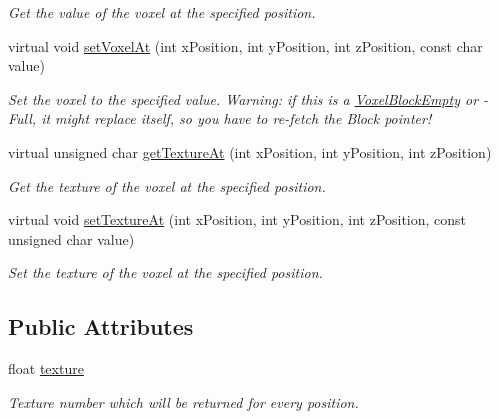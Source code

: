 \begin{DoxyCompactItemize}
\begin{DoxyCompactList}\small\item\em \-Get the value of the voxel at the specified position. \end{DoxyCompactList}\item 
\hypertarget{classVoxelBlockEmpty_a84752cd1c0779368ebcaa0dd67b84b40}{
virtual void \hyperlink{classVoxelBlockEmpty_a84752cd1c0779368ebcaa0dd67b84b40}{set\-Voxel\-At} (int x\-Position, int y\-Position, int z\-Position, const char value)}
\label{d1/dee/classVoxelBlockEmpty_a84752cd1c0779368ebcaa0dd67b84b40}

\begin{DoxyCompactList}\small\item\em \-Set the voxel to the specified value. \-Warning\-: if this is a \hyperlink{classVoxelBlockEmpty}{\-Voxel\-Block\-Empty} or -\/\-Full, it might replace itself, so you have to re-\/fetch the \-Block pointer! \end{DoxyCompactList}\item 
\hypertarget{classVoxelBlockEmpty_a7c7f62d612cb8b40505b229acbaf0f5a}{
virtual unsigned char \hyperlink{classVoxelBlockEmpty_a7c7f62d612cb8b40505b229acbaf0f5a}{get\-Texture\-At} (int x\-Position, int y\-Position, int z\-Position)}
\label{d1/dee/classVoxelBlockEmpty_a7c7f62d612cb8b40505b229acbaf0f5a}

\begin{DoxyCompactList}\small\item\em \-Get the texture of the voxel at the specified position. \end{DoxyCompactList}\item 
\hypertarget{classVoxelBlockEmpty_a70748a413fffdd79148578d5fad66d0f}{
virtual void \hyperlink{classVoxelBlockEmpty_a70748a413fffdd79148578d5fad66d0f}{set\-Texture\-At} (int x\-Position, int y\-Position, int z\-Position, const unsigned char value)}
\label{d1/dee/classVoxelBlockEmpty_a70748a413fffdd79148578d5fad66d0f}

\begin{DoxyCompactList}\small\item\em \-Set the texture of the voxel at the specified position. \end{DoxyCompactList}\end{DoxyCompactItemize}
\subsection*{\-Public \-Attributes}
\begin{DoxyCompactItemize}
\item 
\hypertarget{classVoxelBlockEmpty_aa79635ef8757a07beee30a7f055e9759}{
float \hyperlink{classVoxelBlockEmpty_aa79635ef8757a07beee30a7f055e9759}{texture}}
\label{d1/dee/classVoxelBlockEmpty_aa79635ef8757a07beee30a7f055e9759}

\begin{DoxyCompactList}\small\item\em \-Texture number which will be returned for every position. \end{DoxyCompactList}\end{DoxyCompactItemize}


